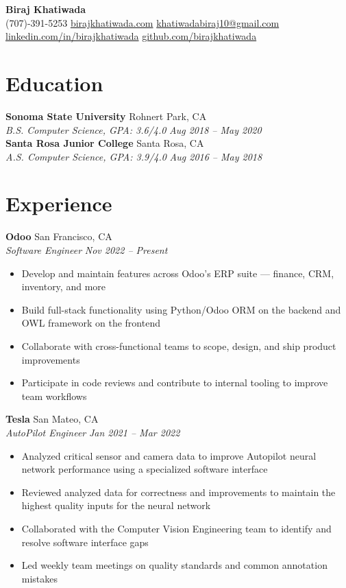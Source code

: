 \documentclass[letterpaper,10.5pt]{article}
\newcommand{\resumeItem}[1]{\item\small{#1}}
\newcommand{\job}[4]{\textbf{#1} \hfill #3 \\ \textit{#2} \hfill \textit{\small #4}}
\begin{document}
\begin{center}
  {\LARGE \textbf{Biraj Khatiwada}} \\[3pt]
  (707)-391-5253 \quad
  \href{https://birajkhatiwada.com}{birajkhatiwada.com} \quad
  \href{mailto:khatiwadabiraj10@gmail.com}{khatiwadabiraj10@gmail.com} \\[2pt]
  \href{https://linkedin.com/in/birajkhatiwada}{linkedin.com/in/birajkhatiwada} \quad
  \href{https://github.com/birajkhatiwada}{github.com/birajkhatiwada}
\end{center}

\section{Education}
\textbf{Sonoma State University} \hfill Rohnert Park, CA \\
\textit{B.S. Computer Science, GPA: 3.6/4.0} \hfill \textit{Aug 2018 -- May 2020} \\[2pt]
\textbf{Santa Rosa Junior College} \hfill Santa Rosa, CA \\
\textit{A.S. Computer Science, GPA: 3.9/4.0} \hfill \textit{Aug 2016 -- May 2018}

\section{Experience}

\job{Odoo}{Software Engineer}{San Francisco, CA}{Nov 2022 -- Present}
\begin{itemize}[leftmargin=0.15in, topsep=2pt, itemsep=0pt, parsep=0pt]
  \resumeItem{Develop and maintain features across Odoo's ERP suite — finance, CRM, inventory, and more}
  \resumeItem{Build full-stack functionality using Python/Odoo ORM on the backend and OWL framework on the frontend}
  \resumeItem{Collaborate with cross-functional teams to scope, design, and ship product improvements}
  \resumeItem{Participate in code reviews and contribute to internal tooling to improve team workflows}
\end{itemize}

\vspace{4pt}
\job{Tesla}{AutoPilot Engineer}{San Mateo, CA}{Jan 2021 -- Mar 2022}
\begin{itemize}[leftmargin=0.15in, topsep=2pt, itemsep=0pt, parsep=0pt]
  \resumeItem{Analyzed critical sensor and camera data to improve Autopilot neural network performance using a specialized software interface}
  \resumeItem{Reviewed analyzed data for correctness and improvements to maintain the highest quality inputs for the neural network}
  \resumeItem{Collaborated with the Computer Vision Engineering team to identify and resolve software interface gaps}
  \resumeItem{Led weekly team meetings on quality standards and common annotation mistakes}
\end{itemize}
\end{document}
